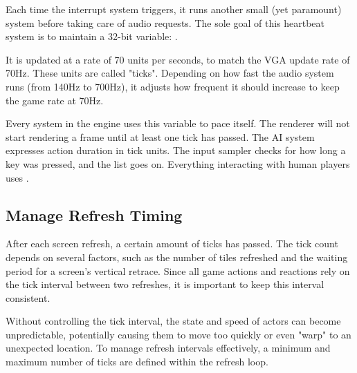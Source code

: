 \documentclass[book.tex]{subfiles}
\begin{document}
\bigskip
\par
\begin{minipage}{\textwidth}

\end{minipage}
\par
\begin{minipage}{\textwidth}

\end{minipage}

\par
Each time the interrupt system triggers, it runs another small (yet paramount) system before taking care of audio requests. The sole goal of this heartbeat system is to maintain a 32-bit variable: .\\

\par
\begin{minipage}{\textwidth}

\end{minipage}

\par
It is updated at a rate of 70 units per seconds, to match the VGA update rate of 70Hz. These units are called "ticks". Depending on how fast the audio system runs (from 140Hz to 700Hz), it adjusts how frequent it should increase  to keep the game rate at 70Hz.\\

\par
Every system in the engine uses this variable to pace itself. The renderer will not start rendering a frame until at least one tick has passed. The AI system expresses action duration in tick units. The input sampler checks for how long a key was pressed, and the list goes on. Everything interacting with human players uses .


\subsection{Manage Refresh Timing}
After each screen refresh, a certain amount of ticks has passed. The tick count depends on several factors, such as the number of tiles refreshed and the waiting period for a screen's vertical retrace. Since all game actions and reactions rely on the tick interval between two refreshes, it is important to keep this interval consistent.\\

\par
Without controlling the tick interval, the state and speed of actors can become unpredictable, potentially causing them to move too quickly or even "warp" to an unexpected location. To manage refresh intervals effectively, a minimum and maximum number of ticks are defined within the refresh loop.\\
\end{document}

